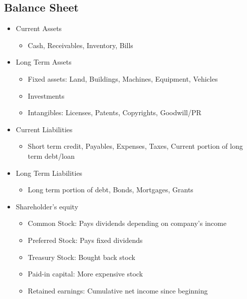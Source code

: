 \documentclass[landscape, letterpaper, 10pt]{article}
\begin{document}
\begin{multicols}{3}
    \subsection*{Balance Sheet}
    \begin{itemize}[noitemsep,nolistsep]
        \item Current Assets
              \begin{itemize}[noitemsep,nolistsep]
                  \item Cash, Receivables, Inventory, Bills
              \end{itemize}
        \item Long Term Assets
              \begin{itemize}[noitemsep,nolistsep]
                  \item Fixed assets: Land, Buildings, Machines, Equipment, Vehicles
                  \item Investments
                  \item Intangibles: Licenses, Patents, Copyrights, Goodwill/PR
              \end{itemize}
        \item Current Liabilities
              \begin{itemize}[noitemsep,nolistsep]
                  \item Short term credit, Payables, Expenses, Taxes, Current portion of long term debt/loan
              \end{itemize}
        \item Long Term Liabilities
              \begin{itemize}[noitemsep,nolistsep]
                  \item Long term portion of debt, Bonds, Mortgages, Grants
              \end{itemize}
        \item Shareholder's equity
              \begin{itemize}[noitemsep,nolistsep]
                  \item Common Stock: Pays dividends depending on company's income
                  \item Preferred Stock: Pays fixed dividends
                  \item Treasury Stock: Bought back stock
                  \item Paid-in capital: More expensive stock
                  \item Retained earnings: Cumulative net income since beginning
              \end{itemize}
    \end{itemize}

\end{multicols}
\end{document}
